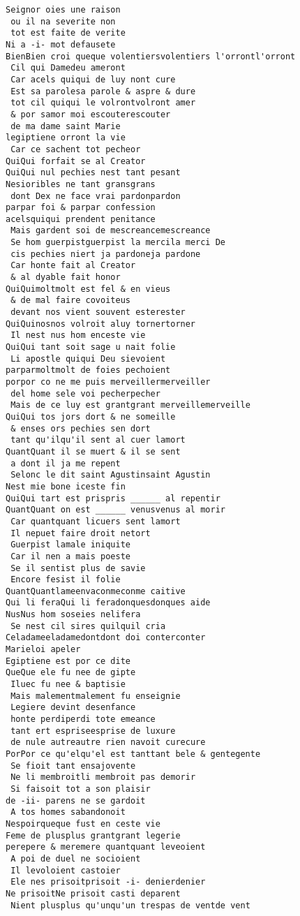 \documentclass[
  letterpaper,
  DIV=11,
  numbers=noendperiod]{scrreprt}
\begin{document}
\begin{verbatim}
Seignor oies une raison
 ou il na severite non
 tot est faite de verite
Ni a -i- mot defausete
BienBien croi queque volentiersvolentiers l'orrontl'orront
 Cil qui Damedeu ameront
 Car acels quiqui de luy nont cure
 Est sa parolesa parole & aspre & dure
 tot cil quiqui le volrontvolront amer
 & por samor moi escouterescouter
 de ma dame saint Marie
legiptiene orront la vie
 Car ce sachent tot pecheor
QuiQui forfait se al Creator
QuiQui nul pechies nest tant pesant
Nesioribles ne tant gransgrans
 dont Dex ne face vrai pardonpardon
parpar foi & parpar confession
acelsquiqui prendent penitance
 Mais gardent soi de mescreancemescreance
 Se hom guerpistguerpist la mercila merci De
 cis pechies niert ja pardoneja pardone
 Car honte fait al Creator
 & al dyable fait honor
QuiQuimoltmolt est fel & en vieus
 & de mal faire covoiteus
 devant nos vient souvent esterester
QuiQuinosnos volroit aluy tornertorner
 Il nest nus hom enceste vie
QuiQui tant soit sage u nait folie
 Li apostle quiqui Deu sievoient
parparmoltmolt de foies pechoient
porpor co ne me puis merveillermerveiller
 del home sele voi pecherpecher
 Mais de ce luy est grantgrant merveillemerveille
QuiQui tos jors dort & ne someille
 & enses ors pechies sen dort
 tant qu'ilqu'il sent al cuer lamort
QuantQuant il se muert & il se sent
 a dont il ja me repent
 Selonc le dit saint Agustinsaint Agustin
Nest mie bone iceste fin
QuiQui tart est prispris ______ al repentir
QuantQuant on est ______ venusvenus al morir
 Car quantquant licuers sent lamort
 Il nepuet faire droit netort
 Guerpist lamale iniquite
 Car il nen a mais poeste
 Se il sentist plus de savie
 Encore fesist il folie
QuantQuantlameenvaconmeconme caitive
Qui li feraQui li feradonquesdonques aide
NusNus hom soseies nelifera
 Se nest cil sires quilquil cria
Celadameeladamedontdont doi conterconter
Marieloi apeler
Egiptiene est por ce dite
QueQue ele fu nee de gipte
 Iluec fu nee & baptisie
 Mais malementmalement fu enseignie
 Legiere devint desenfance
 honte perdiperdi tote emeance
 tant ert espriseesprise de luxure
 de nule autreautre rien navoit curecure
PorPor ce qu'elqu'el est tanttant bele & gentegente
 Se fioit tant ensajovente
 Ne li membroitli membroit pas demorir
 Si faisoit tot a son plaisir
de -ii- parens ne se gardoit
 A tos homes sabandonoit
Nespoirqueque fust en ceste vie
Feme de plusplus grantgrant legerie
perepere & meremere quantquant leveoient
 A poi de duel ne socioient
 Il levoloient castoier
 Ele nes prisoitprisoit -i- denierdenier
Ne prisoitNe prisoit casti deparent
 Nient plusplus qu'unqu'un trespas de ventde vent

\end{verbatim}
\end{document}

